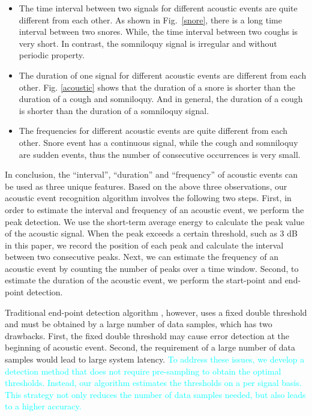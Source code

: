  \begin{itemize}[itemsep=1mm,nolistsep]
\item The time interval between two signals for different acoustic events are quite different from each other. As shown in Fig.~\ref{snore}, there is a long time interval between two snores. While, the time interval between two coughs is very short.  In contrast, the  somniloquy signal is irregular and without periodic property.
 \item The duration of one signal for different acoustic events are different from each other. Fig. \ref{acoustic} shows that the duration of a snore is shorter than the duration of a cough and somniloquy. And in general, the duration of a cough is shorter than the duration of a somniloquy signal.
\item The frequencies for different acoustic events are quite different from each other. Snore event has a continuous signal, while the  cough and somniloquy are sudden events, thus the number of consecutive occurrences is very small.
\end{itemize}
In conclusion, the ``interval'', ``duration'' and ``frequency'' of acoustic events can be used as three unique features. Based on the above three observations, our acoustic event recognition algorithm involves the following two steps. First, in order to estimate the interval and frequency of an acoustic event, we perform the peak detection. We use the short-term average energy to calculate the peak value of the acoustic signal. When the peak exceeds a certain threshold, such as 3 dB in this paper, we record the position of each peak and calculate the interval between two consecutive peaks. Next, we can estimate the frequency of an acoustic event by counting the number of peaks over a time window. Second, to estimate the duration of the acoustic event, we perform the start-point and end-point detection.

Traditional end-point detection algorithm \cite{stowell2015detection}, however, uses a fixed double threshold and must be obtained by a
large number of data samples, which has two drawbacks. First, the fixed double threshold may cause error detection at the beginning of
acoustic event. Second, the requirement of a large number of data samples would lead to large system latency. \textcolor{cyan}{To address
these issues, we develop a detection method that does not require pre-sampling to obtain the optimal thresholds. Instead, our algorithm
estimates the thresholds on a per signal basis. This strategy not only reduces the number of data samples needed, but also leads to a
higher accuracy. }

